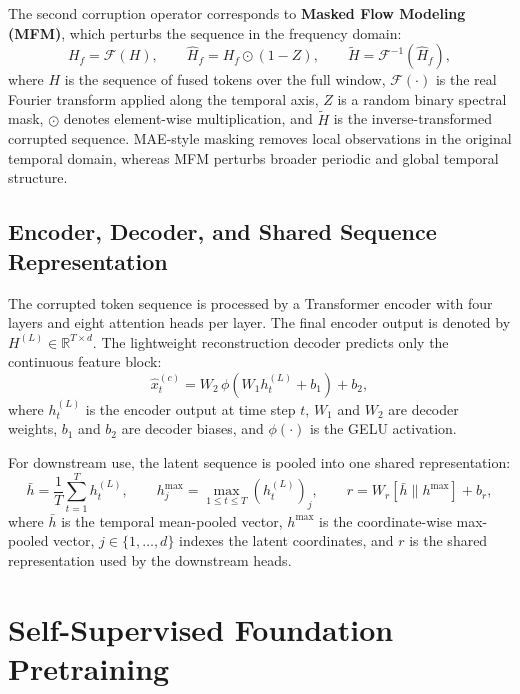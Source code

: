 \documentclass[12pt, a4paper]{report}
\begin{document}
The second corruption operator corresponds to \textbf{Masked Flow Modeling (MFM)}, which perturbs the sequence in the frequency domain:
\begin{equation}
H_f = \mathcal{F}(H), \qquad
\hat{H}_f = H_f \odot (1-Z), \qquad
\tilde{H} = \mathcal{F}^{-1}(\hat{H}_f),
\end{equation}
where $H$ is the sequence of fused tokens over the full window, $\mathcal{F}(\cdot)$ is the real Fourier transform applied along the temporal axis, $Z$ is a random binary spectral mask, $\odot$ denotes element-wise multiplication, and $\tilde{H}$ is the inverse-transformed corrupted sequence. MAE-style masking removes local observations in the original temporal domain, whereas MFM perturbs broader periodic and global temporal structure.




\subsection{Encoder, Decoder, and Shared Sequence Representation}

The corrupted token sequence is processed by a Transformer encoder with four layers and eight attention heads per layer. The final encoder output is denoted by $H^{(L)} \in \mathbb{R}^{T \times d}$. The lightweight reconstruction decoder predicts only the continuous feature block:
\begin{equation}
\hat{x}_t^{(c)} = W_2\,\phi\left(W_1 h_t^{(L)} + b_1\right) + b_2,
\end{equation}
where $h_t^{(L)}$ is the encoder output at time step $t$, $W_1$ and $W_2$ are decoder weights, $b_1$ and $b_2$ are decoder biases, and $\phi(\cdot)$ is the GELU activation.

For downstream use, the latent sequence is pooled into one shared representation:
\begin{equation}
\bar{h} = \frac{1}{T}\sum_{t=1}^{T} h_t^{(L)},
\qquad
h_j^{\max} = \max_{1 \le t \le T} \left(h_t^{(L)}\right)_j,
\qquad
r = W_r\left[\bar{h} \| h^{\max}\right] + b_r,
\end{equation}
where $\bar{h}$ is the temporal mean-pooled vector, $h^{\max}$ is the coordinate-wise max-pooled vector, $j \in \{1,\dots,d\}$ indexes the latent coordinates, and $r$ is the shared representation used by the downstream heads.

\section{Self-Supervised Foundation Pretraining}
\end{document}
